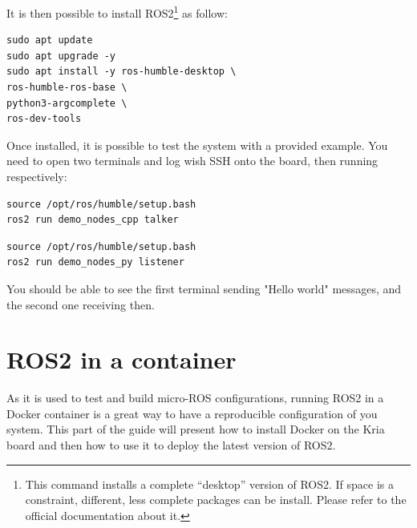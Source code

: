 \documentclass[10pt]{article}
\begin{document}
It is then possible to install ROS2\footnote{This command installs a complete ``desktop'' version of ROS2. If space is a constraint, different, less complete packages can be install. Please refer to the official documentation about it.} as follow:

\begin{tcolorbox}
\begin{verbatim}
sudo apt update
sudo apt upgrade -y
sudo apt install -y ros-humble-desktop \
ros-humble-ros-base \
python3-argcomplete \
ros-dev-tools

\end{verbatim}
\end{tcolorbox}

Once installed, it is possible to test the system with a provided example.
You need to open two terminals and log wish SSH onto the board, then running
respectively:

\begin{tcolorbox}
\begin{verbatim}
source /opt/ros/humble/setup.bash
ros2 run demo_nodes_cpp talker

\end{verbatim}
\end{tcolorbox}



\begin{tcolorbox}
\begin{verbatim}
source /opt/ros/humble/setup.bash
ros2 run demo_nodes_py listener

\end{verbatim}
\end{tcolorbox}


You should be able to see the first terminal sending "Hello world" messages,
and the second one receiving then.


\section{ROS2 in a container}
As it is used to test and build micro-ROS configurations, running ROS2 in a
Docker container is a great way to have a reproducible configuration
of you system. This part of the guide will present how to install Docker on the
Kria board and then how to use it to deploy the latest version of ROS2.
\end{document}
